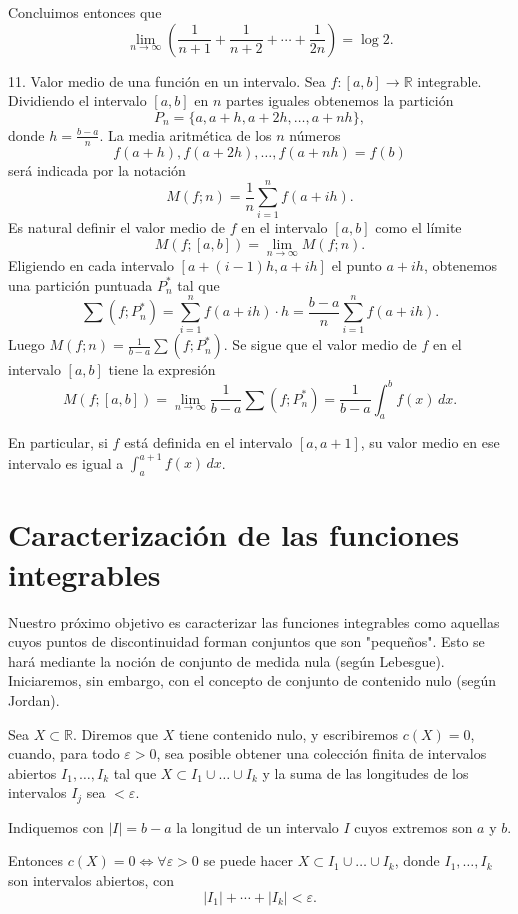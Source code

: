 \documentclass[12pt,oneside]{book}
\begin{document}
Concluimos entonces que
\[
\lim_{n \to \infty} \left( \frac{1}{n+1} + \frac{1}{n+2} + \cdots + \frac{1}{2n} \right) = \log 2.
\]

11. Valor medio de una función en un intervalo. Sea \(f: [a, b] \to \mathbb{R}\) integrable. Dividiendo el intervalo \([a, b]\) en \(n\) partes iguales obtenemos la partición
\[
P_n = \{ a, a+h, a+2h, \ldots, a+nh \},
\]
donde \(h = \frac{b-a}{n}\). La media aritmética de los \(n\) números
\[
f(a+h), f(a+2h), \ldots, f(a+nh) = f(b)
\]
será indicada por la notación
\[
M(f; n) = \frac{1}{n} \sum_{i=1}^n f(a+ih).
\]
Es natural definir el valor medio de \(f\) en el intervalo \([a, b]\) como el límite
\[
M(f; [a, b]) = \lim_{n \to \infty} M(f; n).
\]
Eligiendo en cada intervalo \([a+(i-1)h, a+ih]\) el punto \(a+ih\), obtenemos una partición puntuada \(P_n^*\) tal que
\[
\sum (f; P_n^*) = \sum_{i=1}^n f(a + ih) \cdot h = \frac{b - a}{n} \sum_{i=1}^n f(a + ih).
\]
Luego \(M(f; n) = \frac{1}{b - a} \sum (f; P_n^*)\). Se sigue que el valor medio de \(f\) en el intervalo \([a, b]\) tiene la expresión
\[
M(f; [a, b]) = \lim_{n \to \infty} \frac{1}{b - a} \sum (f; P_n^*) = \frac{1}{b - a} \int_a^b f(x) \, dx.
\]

En particular, si \(f\) está definida en el intervalo \([a, a + 1]\), su valor medio en ese intervalo es igual a \(\int_a^{a+1} f(x) \, dx\).

\section{Caracterización de las funciones integrables}

Nuestro próximo objetivo es caracterizar las funciones integrables como aquellas cuyos puntos de discontinuidad forman conjuntos que son "pequeños". Esto se hará mediante la noción de conjunto de medida nula (según Lebesgue). Iniciaremos, sin embargo, con el concepto de conjunto de contenido nulo (según Jordan).

Sea \(X \subset \mathbb{R}\). Diremos que \(X\) tiene contenido nulo, y escribiremos \(c(X) = 0\), cuando, para todo \(\varepsilon > 0\), sea posible obtener una colección finita de intervalos abiertos \(I_1, \dots, I_k\) tal que \(X \subset I_1 \cup \dots \cup I_k\) y la suma de las longitudes de los intervalos \(I_j\) sea \(< \varepsilon\).

Indiquemos con \(|I| = b - a\) la longitud de un intervalo \(I\) cuyos extremos son \(a\) y \(b\).

Entonces \(c(X) = 0 \iff \forall \varepsilon > 0\) se puede hacer \(X \subset I_1 \cup \dots \cup I_k\), donde \(I_1, \dots, I_k\) son intervalos abiertos, con
\[
|I_1| + \cdots + |I_k| < \varepsilon.
\]
\end{document}
